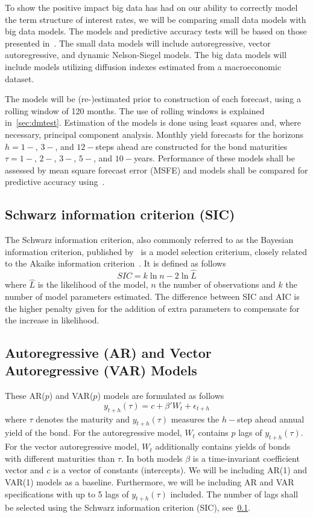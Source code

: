 To show the positive impact big data has had on our ability to correctly model the term structure of interest rates, we will be comparing small data models with big data models. The models and predictive accuracy tests will be based on those presented in~\textcite{Swanson2017}. The small data models will include autoregressive, vector autoregressive, and dynamic Nelson-Siegel models. The big data models will include models utilizing diffusion indexes estimated from a macroeconomic dataset. 

The models will be (re-)estimated prior to construction of each forecast, using a rolling window of 120 months. The use of rolling windows is explained in~\cref{sec:dmtest}. Estimation of the models is done using least squares and, where necessary, principal component analysis. Monthly yield forecasts for the horizons $h = 1-$, $3-$, and $12-$steps ahead are constructed for the bond maturities $\tau = 1-$, $2-$, $3-$, $5-$, and $10-$years. Performance of these models shall be assessed by mean square forecast error (MSFE) and models shall be compared for predictive accuracy using~\textcite[hereafter DM]{Diebold1994}. 

\subsection{Schwarz information criterion (SIC)}
\label{sec:sic}
The Schwarz information criterion, also commonly referred to as the Bayesian information criterion, published by~\textcite[hereafter SIC]{Schwarz1978} is a model selection criterium, closely related to the Akaike information criterion~\parencite{Akaike1974}. It is defined as follows
\begin{equation}
	SIC = k\ln{n} - 2\ln{\hat{L}}
\end{equation}
where $\hat{L}$ is the likelihood of the model, $n$ the number of observations and $k$ the number of model parameters estimated. The difference between SIC and AIC is the higher penalty given for the addition of extra parameters to compensate for the increase in likelihood.

\subsection{Autoregressive (AR) and Vector Autoregressive (VAR) Models}
\label{sec:arvar}
These AR($p$) and VAR($p$) models are formulated as follows
\begin{equation}
	y_{t+h}(\tau) = c + \beta' W_t + \epsilon_{t+h}
\end{equation}
where $\tau$ denotes the maturity and $y_{t+h}(\tau)$ measures the $h-$step ahead annual yield of the bond. For the autoregressive model, $W_t$ contains $p$ lags of $y_{t+h}(\tau)$. For the vector autoregressive model, $W_t$ additionally contains yields of bonds with different maturities than $\tau$. In both models $\beta$ is a time-invariant coefficient vector and $c$ is a vector of constants (intercepts). We will be including AR(1) and VAR(1) models as a baseline. Furthermore, we will be including AR and VAR specifications with up to 5 lags of $y_{t+h}(\tau)$ included. The number of lags shall be selected using the Schwarz information criterion (SIC), see~\cref{sec:sic}. 

